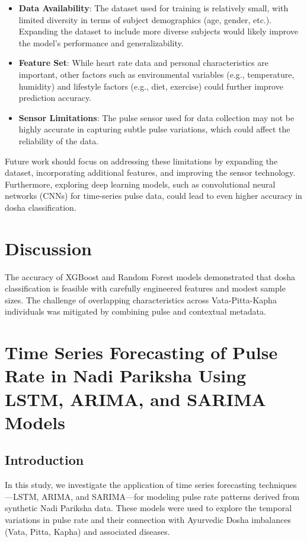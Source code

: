 \documentclass[10pt,twocolumn]{article}
\begin{document}
\begin{itemize}
    \item \textbf{Data Availability}: The dataset used for training is relatively small, with limited diversity in terms of subject demographics (age, gender, etc.). Expanding the dataset to include more diverse subjects would likely improve the model's performance and generalizability.
    \item \textbf{Feature Set}: While heart rate data and personal characteristics are important, other factors such as environmental variables (e.g., temperature, humidity) and lifestyle factors (e.g., diet, exercise) could further improve prediction accuracy.
    \item \textbf{Sensor Limitations}: The pulse sensor used for data collection may not be highly accurate in capturing subtle pulse variations, which could affect the reliability of the data.
\end{itemize}

Future work should focus on addressing these limitations by expanding the dataset, incorporating additional features, and improving the sensor technology. Furthermore, exploring deep learning models, such as convolutional neural networks (CNNs) for time-series pulse data, could lead to even higher accuracy in dosha classification.

\section{Discussion}
The accuracy of XGBoost and Random Forest models demonstrated that dosha classification is feasible with carefully engineered features and modest sample sizes. The challenge of overlapping characteristics across Vata-Pitta-Kapha individuals was mitigated by combining pulse and contextual metadata.

\section{Time Series Forecasting of Pulse Rate in Nadi Pariksha Using LSTM, ARIMA, and SARIMA Models}

\subsection{Introduction}

In this study, we investigate the application of time series forecasting techniques—LSTM, ARIMA, and SARIMA—for modeling pulse rate patterns derived from synthetic Nadi Pariksha data. These models were used to explore the temporal variations in pulse rate and their connection with Ayurvedic Dosha imbalances (Vata, Pitta, Kapha) and associated diseases.
\end{document}
